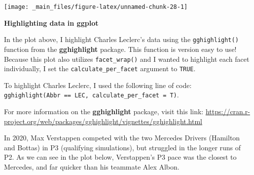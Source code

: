 \documentclass[
]{book}
\begin{document}
\begin{center}\texttt{[image: \_main\_files/figure-latex/unnamed-chunk-28-1]} \end{center}

\begin{blackbox}

\begin{center}
\textbf{Highlighting data in ggplot}

\end{center}

In the plot above, I highlight Charles Leclerc's data using the \texttt{gghighlight()} function from the \textbf{gghighlight} package. This function is version easy to use! Because this plot also utilizes \texttt{facet\_wrap()} and I wanted to highlight each facet individually, I set the \texttt{calculate\_per\_facet} argument to \texttt{TRUE}.

To highlight Charles Leclerc, I used the following line of code: \texttt{gghighlight(Abbr\ ==\ \textquotesingle{}LEC\textquotesingle{},\ calculate\_per\_facet\ =\ T)}.

For more information on the \textbf{gghighlight} package, visit this link: \url{https://cran.r-project.org/web/packages/gghighlight/vignettes/gghighlight.html}

\end{blackbox}

In 2020, Max Verstappen competed with the two Mercedes Drivers (Hamilton and Bottas) in P3 (qualifying simulations), but struggled in the longer runs of P2. As we can see in the plot below, Verstappen's P3 pace was the closest to Mercedes, and far quicker than his teammate Alex Albon.
\end{document}
